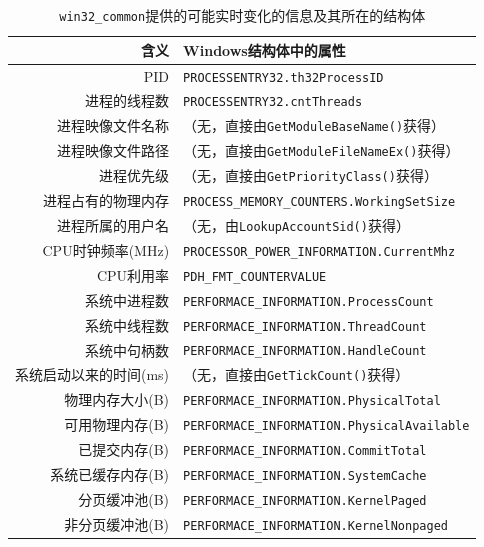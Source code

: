 \documentclass[UTF8,twoside,titlepage]{ctexart}
\newcommand\code[1]{\texttt{#1}}
\begin{document}
\begin{table}[htb]
    \centering
    \begin{tabular}{rl}
        \hline
        含义 & Windows结构体中的属性 \\
        \hline
        PID & \code{PROCESSENTRY32.th32ProcessID} \\
        进程的线程数 & \code{PROCESSENTRY32.cntThreads} \\
        进程映像文件名称 & （无，直接由\code{GetModuleBaseName()}获得） \\
        进程映像文件路径 & （无，直接由\code{GetModuleFileNameEx()}获得） \\
        进程优先级 & （无，直接由\code{GetPriorityClass()}获得） \\
        进程占有的物理内存 & \code{PROCESS\_MEMORY\_COUNTERS.WorkingSetSize} \\
        进程所属的用户名 & （无，由\code{LookupAccountSid()}获得） \\
        CPU时钟频率(MHz) & \code{PROCESSOR\_POWER\_INFORMATION.CurrentMhz} \\
        CPU利用率 & \code{PDH\_FMT\_COUNTERVALUE} \\
        系统中进程数 & \code{PERFORMACE\_INFORMATION.ProcessCount} \\
        系统中线程数 & \code{PERFORMACE\_INFORMATION.ThreadCount} \\
        系统中句柄数 & \code{PERFORMACE\_INFORMATION.HandleCount} \\
        系统启动以来的时间(ms) & （无，直接由\code{GetTickCount()}获得） \\
        物理内存大小(B) & \code{PERFORMACE\_INFORMATION.PhysicalTotal} \\
        可用物理内存(B) & \code{PERFORMACE\_INFORMATION.PhysicalAvailable} \\
        已提交内存(B) & \code{PERFORMACE\_INFORMATION.CommitTotal} \\
        系统已缓存内存(B) & \code{PERFORMACE\_INFORMATION.SystemCache} \\
        分页缓冲池(B) & \code{PERFORMACE\_INFORMATION.KernelPaged} \\
        非分页缓冲池(B) & \code{PERFORMACE\_INFORMATION.KernelNonpaged} \\
        \hline
    \end{tabular}
    \caption{\code{win32\_common}提供的可能实时变化的信息及其所在的结构体}
    \label{table:field.struc}
\end{table}
\end{document}
